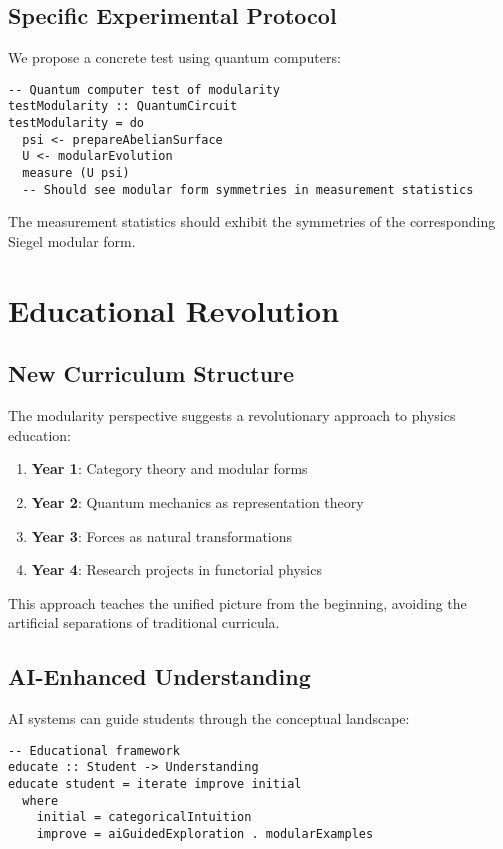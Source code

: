\documentclass[12pt,a4paper]{article}
\begin{document}
\subsection{Specific Experimental Protocol}

We propose a concrete test using quantum computers:

\begin{lstlisting}[style=haskell]
-- Quantum computer test of modularity
testModularity :: QuantumCircuit
testModularity = do
  psi <- prepareAbelianSurface
  U <- modularEvolution
  measure (U psi)
  -- Should see modular form symmetries in measurement statistics
\end{lstlisting}

The measurement statistics should exhibit the symmetries of the corresponding Siegel modular form.

\section{Educational Revolution}

\subsection{New Curriculum Structure}

The modularity perspective suggests a revolutionary approach to physics education:

\begin{enumerate}
\item \textbf{Year 1}: Category theory and modular forms
\item \textbf{Year 2}: Quantum mechanics as representation theory
\item \textbf{Year 3}: Forces as natural transformations
\item \textbf{Year 4}: Research projects in functorial physics
\end{enumerate}

This approach teaches the unified picture from the beginning, avoiding the artificial separations of traditional curricula.

\subsection{AI-Enhanced Understanding}

AI systems can guide students through the conceptual landscape:

\begin{lstlisting}[style=haskell]
-- Educational framework
educate :: Student -> Understanding
educate student = iterate improve initial
  where
    initial = categoricalIntuition
    improve = aiGuidedExploration . modularExamples
\end{lstlisting}
\end{document}
